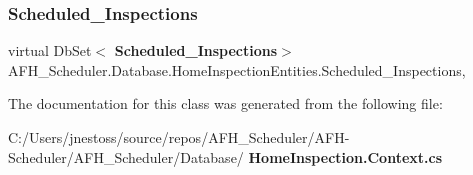 \subsubsection{Scheduled\_Inspections}
{\footnotesize\ttfamily virtual Db\+Set$<$\textbf{ Scheduled\+\_\+\+Inspections}$>$ A\+F\+H\+\_\+\+Scheduler.\+Database.\+Home\+Inspection\+Entities.\+Scheduled\+\_\+\+Inspections\hspace{0.3cm}{\ttfamily [get]}, {\ttfamily [set]}}



The documentation for this class was generated from the following file\+:\begin{DoxyCompactItemize}
\item 
C\+:/\+Users/jnestoss/source/repos/\+A\+F\+H\+\_\+\+Scheduler/\+A\+F\+H-\/\+Scheduler/\+A\+F\+H\+\_\+\+Scheduler/\+Database/\textbf{ Home\+Inspection.\+Context.\+cs}\end{DoxyCompactItemize}
